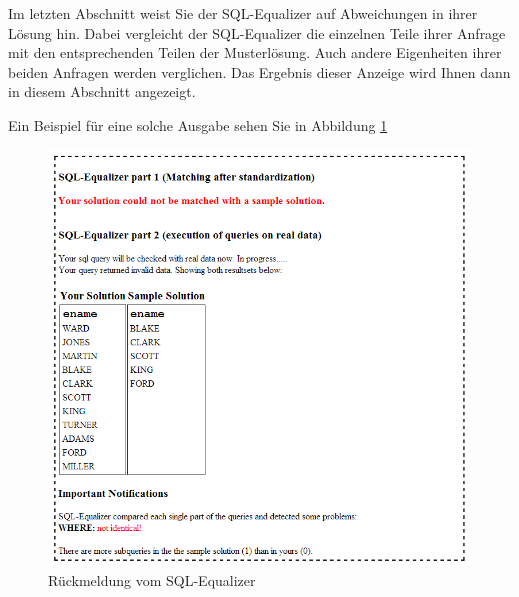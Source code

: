\documentclass[12pt]{scrreprt}
\theoremstyle{remark}
\begin{document}
Im letzten Abschnitt weist Sie der SQL-Equalizer auf Abweichungen in ihrer Lösung hin. Dabei vergleicht der SQL-Equalizer die einzelnen Teile ihrer Anfrage mit den entsprechenden Teilen der Musterlösung. Auch andere Eigenheiten ihrer beiden Anfragen werden verglichen. Das Ergebnis dieser Anzeige wird Ihnen dann in diesem Abschnitt angezeigt.

Ein Beispiel für eine solche Ausgabe sehen Sie in Abbildung \ref{fig:screen_user_1}

\begin{figure}[H]
\centering
\includegraphics[scale=0.61]{Bilder/screen_user_6.png}
\caption{Rückmeldung vom SQL-Equalizer}
\label{fig:screen_user_1}
\end{figure}


\end{document}
